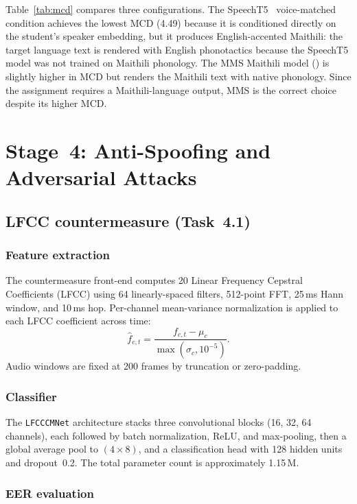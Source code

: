 \documentclass[10pt,twocolumn,letterpaper]{article}
\begin{document}
Table~\ref{tab:mcd} compares three configurations.  The
SpeechT5~\cite{ao2021speecht5} voice-matched condition achieves the
lowest MCD (4.49) because it is conditioned directly on the student's
speaker embedding, but it produces English-accented Maithili: the
target language text is rendered with English phonotactics because the
SpeechT5 model was not trained on Maithili phonology.  The MMS
Maithili model (\MCDLectureMMS) is slightly higher in MCD but renders
the Maithili text with native phonology.  Since the assignment
requires a Maithili-language output, MMS is the correct choice despite
its higher MCD.

\section{Stage~4: Anti-Spoofing and Adversarial Attacks}
\label{sec:part4}

\subsection{LFCC countermeasure (Task~4.1)}
\label{sec:cm}

\subsubsection{Feature extraction}
The countermeasure front-end computes 20 Linear Frequency Cepstral
Coefficients (LFCC) using 64 linearly-spaced filters, 512-point FFT,
25\,ms Hann window, and 10\,ms hop.  Per-channel mean-variance
normalization is applied to each LFCC coefficient across time:
\begin{equation}
  \hat{f}_{c,t} = \frac{f_{c,t}-\mu_c}{\max(\sigma_c,10^{-5})}.
  \label{eq:cmvn}
\end{equation}
Audio windows are fixed at 200 frames by truncation or zero-padding.

\subsubsection{Classifier}
The \texttt{LFCCCMNet} architecture stacks three convolutional blocks
(16, 32, 64 channels), each followed by batch normalization, ReLU, and
max-pooling, then a global average pool to $(4\times8)$, and a
classification head with 128 hidden units and dropout~0.2.  The total
parameter count is approximately 1.15\,M.

\subsubsection{EER evaluation}
\label{sec:eer}
\end{document}
